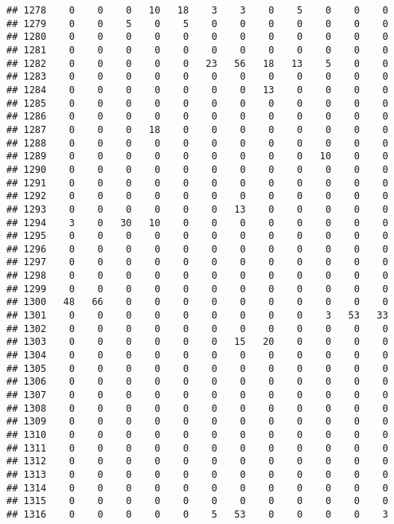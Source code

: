 \documentclass[]{article}
\begin{document}
\begin{verbatim}
## 1278    0    0    0   10   18    3    3    0    5    0    0    0
## 1279    0    0    5    0    5    0    0    0    0    0    0    0
## 1280    0    0    0    0    0    0    0    0    0    0    0    0
## 1281    0    0    0    0    0    0    0    0    0    0    0    0
## 1282    0    0    0    0    0   23   56   18   13    5    0    0
## 1283    0    0    0    0    0    0    0    0    0    0    0    0
## 1284    0    0    0    0    0    0    0   13    0    0    0    0
## 1285    0    0    0    0    0    0    0    0    0    0    0    0
## 1286    0    0    0    0    0    0    0    0    0    0    0    0
## 1287    0    0    0   18    0    0    0    0    0    0    0    0
## 1288    0    0    0    0    0    0    0    0    0    0    0    0
## 1289    0    0    0    0    0    0    0    0    0   10    0    0
## 1290    0    0    0    0    0    0    0    0    0    0    0    0
## 1291    0    0    0    0    0    0    0    0    0    0    0    0
## 1292    0    0    0    0    0    0    0    0    0    0    0    0
## 1293    0    0    0    0    0    0   13    0    0    0    0    0
## 1294    3    0   30   10    0    0    0    0    0    0    0    0
## 1295    0    0    0    0    0    0    0    0    0    0    0    0
## 1296    0    0    0    0    0    0    0    0    0    0    0    0
## 1297    0    0    0    0    0    0    0    0    0    0    0    0
## 1298    0    0    0    0    0    0    0    0    0    0    0    0
## 1299    0    0    0    0    0    0    0    0    0    0    0    0
## 1300   48   66    0    0    0    0    0    0    0    0    0    0
## 1301    0    0    0    0    0    0    0    0    0    3   53   33
## 1302    0    0    0    0    0    0    0    0    0    0    0    0
## 1303    0    0    0    0    0    0   15   20    0    0    0    0
## 1304    0    0    0    0    0    0    0    0    0    0    0    0
## 1305    0    0    0    0    0    0    0    0    0    0    0    0
## 1306    0    0    0    0    0    0    0    0    0    0    0    0
## 1307    0    0    0    0    0    0    0    0    0    0    0    0
## 1308    0    0    0    0    0    0    0    0    0    0    0    0
## 1309    0    0    0    0    0    0    0    0    0    0    0    0
## 1310    0    0    0    0    0    0    0    0    0    0    0    0
## 1311    0    0    0    0    0    0    0    0    0    0    0    0
## 1312    0    0    0    0    0    0    0    0    0    0    0    0
## 1313    0    0    0    0    0    0    0    0    0    0    0    0
## 1314    0    0    0    0    0    0    0    0    0    0    0    0
## 1315    0    0    0    0    0    0    0    0    0    0    0    0
## 1316    0    0    0    0    0    5   53    0    0    0    0    3

\end{verbatim}
\end{document}
